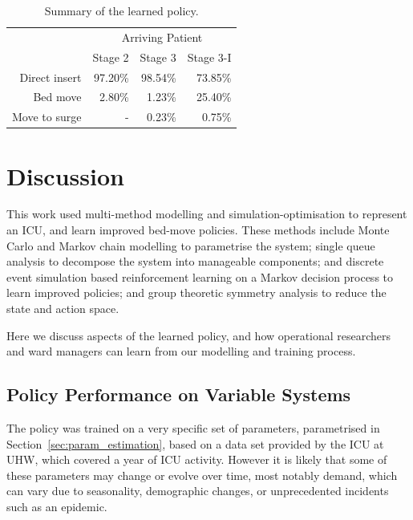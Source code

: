 \documentclass{article}
\begin{document}
\begin{table}
\begin{center}
\begin{tabular}{rrrr}
\toprule
& \multicolumn{3}{c}{Arriving Patient} \\
& Stage 2 & Stage 3 & Stage 3-I \\
\midrule
Direct insert & 97.20\% & 98.54\% & 73.85\% \\
Bed move & 2.80\% & 1.23\% & 25.40\% \\
Move to surge & - & 0.23\% & 0.75\% \\
\bottomrule
\end{tabular}
\caption{Summary of the learned policy.}
\label{tbl:policy_summary}
\end{center}
\end{table}


\section{Discussion}\label{sec:discussion}
This work used multi-method modelling and simulation-optimisation to represent
an ICU, and learn improved bed-move policies.
These methods include Monte Carlo and Markov chain modelling to parametrise the
system; single queue analysis to decompose the system into manageable
components; and discrete event simulation based reinforcement learning on a
Markov decision process to learn improved policies; and group theoretic symmetry
analysis to reduce the state and action space.

Here we discuss aspects of the learned policy, and how operational researchers
and ward managers can learn from our modelling and training process.

\subsection{Policy Performance on Variable Systems}
The policy was trained on a very specific set of parameters, parametrised in
Section~\ref{sec:param_estimation}, based on a data set provided by the ICU at
UHW, which covered a year of ICU activity.
However it is likely that some of these parameters may change or evolve over
time, most notably demand, which can vary due to seasonality, demographic
changes, or unprecedented incidents such as an epidemic.
\end{document}
